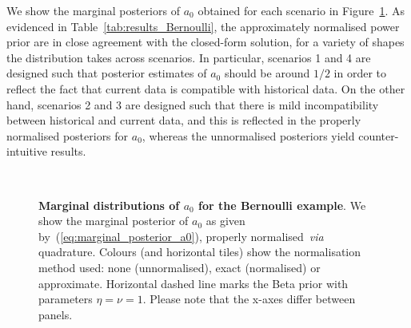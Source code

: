 \documentclass[a4paper, notitlepage, 11pt]{article}
\begin{document}
We show the marginal posteriors of $a_0$ obtained for each scenario in Figure~\ref{fig:marginal_a0_Bernoulli}.
As evidenced in Table~\ref{tab:results_Bernoulli}, the approximately normalised power prior are in close agreement with the closed-form solution, for a variety of shapes the distribution takes across scenarios.
In particular, scenarios 1 and 4 are designed such that posterior estimates of $a_0$ should be around $1/2$ in order to reflect the fact that current data is compatible with historical data.
On the other hand, scenarios 2 and 3 are designed such that there is mild incompatibility between historical and current data, and this is reflected in the properly normalised posteriors for $a_0$, whereas the unnormalised posteriors yield counter-intuitive results.

\begin{figure}[!ht]
\begin{center}
 \hfill
{}
\hfill
{}\\
\hfill
{}
\hfill
{}
\hfill
\end{center}
\caption{\textbf{Marginal distributions of $a_0$ for the Bernoulli example}.
We show the marginal posterior of $a_0$ as given by~(\ref{eq:marginal_posterior_a0}), properly normalised~\textit{via} quadrature.
Colours (and horizontal tiles) show the normalisation method used: none (unnormalised), exact (normalised) or approximate.
Horizontal dashed line marks the Beta prior with parameters $\eta = \nu = 1$.
Please note that the x-axes differ between panels.
}
\label{fig:marginal_a0_Bernoulli}
\end{figure}
\end{document}
